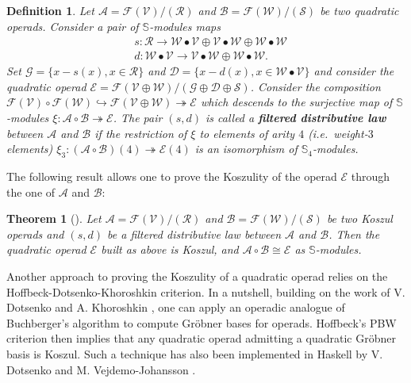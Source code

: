 \documentclass[10pt]{article}
\newtheorem {theorem} [lemma] {Theorem}
\newtheorem {definition}[lemma] {Definition}
\theoremstyle{definition}
\begin{document}
\begin{definition}
\label{definition-filtered-law}
Let $\mathcal{A}= \mathcal{F}(\mathcal{V})/(\mathcal{R})$ and $\mathcal{B}= \mathcal{F}(\mathcal{W})/ (\mathcal{S})$ be two quadratic operads. Consider a pair of $\mathbb{S}$-modules maps
\begin{align}
&s: \mathcal{R} \to \mathcal{W} \bullet \mathcal{V} \oplus \mathcal{V} \bullet \mathcal{W} \oplus \mathcal{W} \bullet \mathcal{W} \label{eq:filtered-law-one}\\
&d:\mathcal{W} \bullet \mathcal{V} \to \mathcal{V} \bullet \mathcal{W} \oplus \mathcal{W} \bullet \mathcal{W}. \label{eq:filtered-law-two}
\end{align}
Set $\mathcal{G}=\{x - s(x), x \in \mathcal{R} \}$ and $\mathcal{D}=\{x - d(x), x \in \mathcal{W} \bullet \mathcal{V} \}$ and consider the quadratic operad $\mathcal{E} = \mathcal{F}(\mathcal{V} \oplus \mathcal{W})/(\mathcal{G} \oplus \mathcal{D} \oplus \mathcal{S})$. Consider the composition $\mathcal{F}(\mathcal{V}) \circ \mathcal{F}(\mathcal{W}) \hookrightarrow \mathcal{F}(\mathcal{V} \oplus \mathcal{W}) \twoheadrightarrow \mathcal{E}$
which descends to the surjective map of $\mathbb{S}$-modules $\xi: \mathcal{A} \circ \mathcal{B} \twoheadrightarrow \mathcal{E}$.
The pair $(s,d)$ is called a \textbf{filtered distributive law} between $\mathcal{A}$ and $\mathcal{B}$ if the restriction of $\xi$ to elements of arity $4$ (i.e.\ weight-$3$ elements) $\xi_3: 
(\mathcal{A}\circ\mathcal{B})(4) \twoheadrightarrow \mathcal{E}(4)$ is an isomorphism of $\mathbb{S}_{4}$-modules.
\end{definition}


The following result allows one to prove the Koszulity of the operad $\mathcal{E}$ through the one of $\mathcal{A}$ and $\mathcal{B}$:
\begin{theorem}[{\cite[Theorem 5.2]{DG}}]
\label{theorem-Koszulity}
Let $\mathcal{A}= \mathcal{F}(\mathcal{V})/(\mathcal{R})$ and $\mathcal{B}= \mathcal{F}(\mathcal{W})/ (\mathcal{S})$ be two Koszul operads and $(s,d)$ be a filtered distributive law between $\mathcal{A}$ and $\mathcal{B}$. Then the quadratic operad $\mathcal{E}$ built as above is Koszul, and $\mathcal{A} \circ \mathcal{B} \cong \mathcal{E}$ as $\mathbb{S}$-modules.
\end{theorem}

Another approach to proving the Koszulity of a quadratic operad relies on the Hoffbeck-Dotsenko-Khoroshkin criterion. In a nutshell, building on the work of V. Dotsenko and A. Khoroshkin \cite{DK}, one can apply an operadic analogue of Buchberger's algorithm \cite{Buch} to compute Gr\"obner bases for operads. Hoffbeck's PBW criterion \cite{Hoff} then implies that any quadratic operad admitting a quadratic Gr\"obner basis is Koszul. Such a technique has also been implemented in Haskell by V. Dotsenko and M. Vejdemo-Johansson \cite{DVJ}. 
\end{document}
